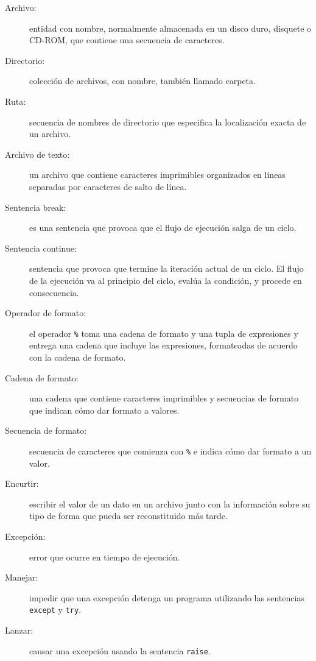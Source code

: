   
  
  
   
  
\begin{description}
\item [{Archivo:}] entidad con nombre, normalmente almacenada en un disco
duro, disquete o CD-ROM, que contiene una secuencia de caracteres.
\item [{Directorio:}] colección de archivos, con nombre, también llamado
carpeta.
\item [{Ruta:}] secuencia de nombres de directorio que especifica la localización
exacta de un archivo.
\item [{Archivo de texto:}] un archivo que contiene caracteres imprimibles
organizados en líneas separadas por caracteres de salto de línea.
\item [{Sentencia break:}] es una sentencia que provoca que el flujo de
ejecución salga de un ciclo.
\item [{Sentencia continue:}] sentencia que provoca que termine la iteración
actual de un ciclo. El flujo de la ejecución va al principio del ciclo,
evalúa la condición, y procede en consecuencia.
\item [{Operador de formato:}] el operador \texttt{\%} toma una cadena
de formato y una tupla de expresiones y entrega una cadena que incluye
las expresiones, formateadas de acuerdo con la cadena de formato.
\item [{Cadena de formato:}] una cadena que contiene caracteres imprimibles
y secuencias de formato que indican cómo dar formato a valores.
\item [{Secuencia de formato:}] secuencia de caracteres que comienza con
\texttt{\%} e indica cómo dar formato a un valor.
\item [{Encurtir:}] escribir el valor de un dato en un archivo junto con
la información sobre su tipo de forma que pueda ser reconstituido
más tarde.
\item [{Excepción:}] error que ocurre en tiempo de ejecución.
\item [{Manejar:}] impedir que una excepción detenga un programa utilizando
las sentencias \texttt{except} y \texttt{try}.
\item [{Lanzar:}] causar una excepción usando la sentencia \texttt{raise}.
\end{description}

